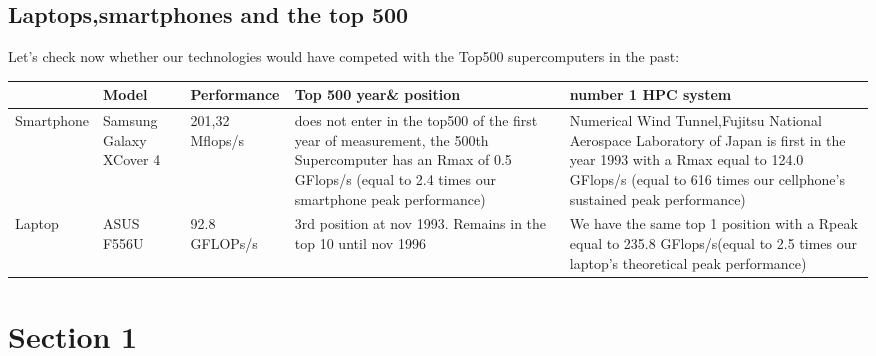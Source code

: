 \documentclass[11pt]{scrartcl} %
\begin{document}
\subsection{Laptops,smartphones and the top 500}
Let's check now whether our technologies would have competed with the Top500 supercomputers in the past:
\begin{adjustwidth}{-2cm}{}
	\begin{tabular}[H]{p{}| p{}| p{} | p{}| p{}}
		\hline
			&Model&Performance&Top 500 year\& position&number 1 HPC system\\
			\hline
			Smartphone&Samsung Galaxy XCover 4 &201,32 Mflops/s &does not enter in the top500 of the first year of measurement, the 500th Supercomputer has an Rmax of 0.5 GFlops/s (equal to 2.4 times our smartphone peak performance)& Numerical Wind Tunnel,Fujitsu National Aerospace Laboratory of Japan is first in the year 1993 with a Rmax equal to 124.0 GFlops/s (equal to 616 times our cellphone's sustained peak performance)\\
			\hline
			Laptop&ASUS F556U&92.8 GFLOPs/s& 3rd position at nov 1993. Remains in the top 10 until nov 1996 & We have the same top 1  position with a Rpeak equal to 235.8 GFlops/s(equal to 2.5 times our laptop's theoretical peak performance)\\
		\end{tabular}
\end{adjustwidth}



\section{Section 1}
\end{document}

